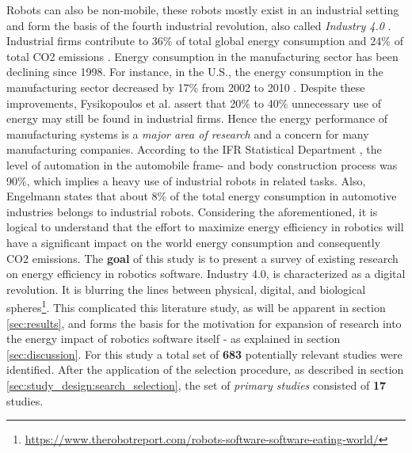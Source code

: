 Robots can also be non-mobile, these robots mostly exist in an industrial setting and form the basis of the fourth industrial revolution,
also called \textit{Industry 4.0} \cite{lasi2014industry4}. 
Industrial firms contribute to 36\% of total global energy consumption and 24\% of total CO2 emissions \cite{international2006energy}.
Energy consumption in the manufacturing sector has been declining since 1998. 
For instance, in the U.S., the energy consumption in the manufacturing sector decreased by 17\% from 2002 to 2010 \cite{US2018energy_administration}.
Despite these improvements, 
Fysikopoulos et al. \cite{fysikopoulos2012automotive_energy_consumption} assert that 20\% to 40\% unnecessary use of energy may still be found in industrial firms. 
Hence the energy performance of manufacturing systems is a \textit{major area of research} and a concern for many manufacturing companies.
According to the IFR Statistical Department \cite{IFR2010executive_summary}, 
the level of automation in the automobile frame- and body construction process was 90\%, which implies a heavy use of industrial robots in related tasks. 
Also, Engelmann \cite{engelmann2009energy_efficient_factories} states that about 8\% of the total energy consumption in automotive industries belongs to industrial robots.
Considering the aforementioned, it is logical to understand that the effort to maximize energy efficiency in robotics will have a 
significant impact on the world energy consumption and consequently CO2 emissions.
The \textbf{goal} of this study is to present a survey of existing research on energy efficiency in robotics software.
Industry 4.0, is characterized as a digital revolution.
It is blurring the lines between physical, digital, and biological spheres\footnote{\url{https://www.therobotreport.com/robots-software-software-eating-world/}}.
This complicated this literature study, as will be apparent in section \ref{sec:results}, 
and forms the basis for the motivation for expansion of research into the energy impact of robotics software itself 
- as explained in section \ref{sec:discussion}.
For this study a total set of \textbf{683} potentially relevant studies were identified. 
After the application of the selection procedure, as described in section \ref{sec:study_design:search_selection}, 
the set of \textit{primary studies} consisted of \textbf{17} studies.